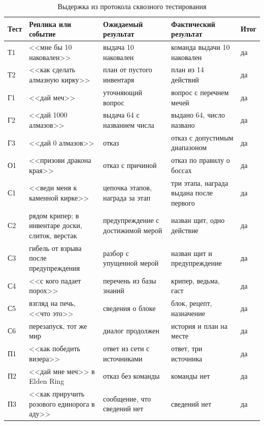 \begin{table}[!htbp]
  \centering
  \caption{Выдержка из протокола сквозного тестирования}
  \label{tab:protocol}
  \begin{tabular}{|>{\raggedright\arraybackslash}p{}
                  |>{\raggedright\arraybackslash}p{}
                  |>{\raggedright\arraybackslash}p{}
                  |>{\raggedright\arraybackslash}p{}
                  |>{\raggedright\arraybackslash}p{}|}
    \hline
    Тест & Реплика или событие & Ожидаемый результат & Фактический результат & Итог \\
    \hline
    Т1 & <<мне бы 10 наковален>> & выдача 10 наковален & команда выдачи 10 наковален & да \\
    \hline
    Т2 & <<как сделать алмазную кирку>> & план от пустого инвентаря & план из 14 действий & да \\
    \hline
    Г1 & <<дай меч>> & уточняющий вопрос & вопрос с перечнем мечей & да \\
    \hline
    Г2 & <<дай 1000 алмазов>> & выдача 64 с названием числа & выдано 64, число названо & да \\
    \hline
    Г3 & <<дай 0 алмазов>> & отказ & отказ с допустимым диапазоном & да \\
    \hline
    О1 & <<призови дракона края>> & отказ с причиной & отказ по правилу о боссах & да \\
    \hline
    С1 & <<веди меня к каменной кирке>> & цепочка этапов, награда за этап & три этапа, награда выдана после первого & да \\
    \hline
    С2 & рядом крипер; в инвентаре доски, слиток, верстак & предупреждение с достижимой мерой & назван щит, одно действие & да \\
    \hline
    С3 & гибель от взрыва после предупреждения & разбор с упущенной мерой & назван щит и предупреждение & да \\
    \hline
    С4 & <<с кого падает порох>> & перечень из базы знаний & крипер, ведьма, гаст & да \\
    \hline
    С5 & взгляд на печь, <<что это>> & сведения о блоке & блок, рецепт, назначение & да \\
    \hline
    С6 & перезапуск, тот же мир & диалог продолжен & история и план на месте & да \\
    \hline
    П1 & <<как победить визера>> & ответ из сети с источниками & ответ, три источника & да \\
    \hline
    П2 & <<дай мне меч>> в Elden Ring & отказ без команды & команды нет & да \\
    \hline
    П3 & <<как приручить розового единорога в аду>> & сообщение, что сведений нет & сведений нет & да \\
    \hline
  \end{tabular}
\end{table}

